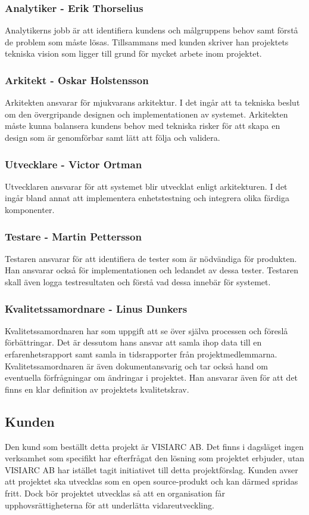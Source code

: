 \subsubsection*{Analytiker - Erik Thorselius}
Analytikerns jobb är att identifiera kundens och målgruppens behov samt förstå de problem som måste lösas. Tillsammans med kunden skriver han projektets tekniska vision som ligger till grund för mycket arbete inom projektet.

\subsubsection*{Arkitekt - Oskar Holstensson}
Arkitekten ansvarar för mjukvarans arkitektur. I det ingår att ta tekniska beslut om den övergripande designen och implementationen av systemet. Arkitekten måste kunna balansera kundens behov med tekniska risker för att skapa en design som är genomförbar samt lätt att följa och validera.

\subsubsection*{Utvecklare - Victor Ortman}
Utvecklaren ansvarar för att systemet blir utvecklat enligt arkitekturen. I det ingår bland annat att implementera enhetstestning och integrera olika färdiga komponenter.

\subsubsection*{Testare - Martin Pettersson}
Testaren ansvarar för att identifiera de tester som är nödvändiga för produkten. Han ansvarar också för implementationen och ledandet av dessa tester. Testaren skall även logga testresultaten och förstå vad dessa innebär för systemet.

\subsubsection*{Kvalitetssamordnare - Linus Dunkers}
Kvalitetssamordnaren har som uppgift att se över själva processen och föreslå förbättringar. Det är dessutom hans ansvar att samla ihop data till en erfarenhetsrapport samt samla in tidsrapporter från projektmedlemmarna. Kvalitetssamordnaren är även dokumentansvarig och tar också hand om eventuella förfrågningar om ändringar i projektet. Han ansvarar även för att det finns en klar definition av projektets kvalitetskrav.

\subsection{Kunden}
Den kund som beställt detta projekt är VISIARC AB. Det finns i dagsläget ingen verksamhet som specifikt har efterfrågat den lösning som projektet erbjuder, utan VISIARC AB har istället tagit initiativet till detta projektförslag. Kunden avser att projektet ska utvecklas som en open source-produkt och kan därmed spridas fritt. Dock bör projektet utvecklas så att en organisation får upphovsrättigheterna för att underlätta vidareutveckling.

